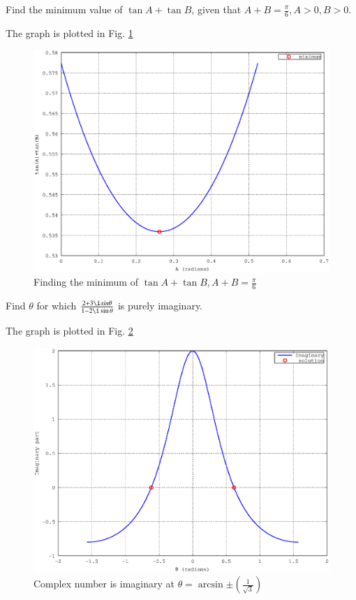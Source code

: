 \documentclass[journal,12pt,twocolumn]{IEEEtran}
\begin{document}
\begin{problem}
Find the minimum value of $\tan A + \tan B$, given that $ A+B = \frac{\pi}{6}, A>0,B>0$.
\end{problem}
%
\solution

The graph is plotted in Fig. \ref{fig_25}

%
\begin{figure}[h]
\centering
\includegraphics[width=\columnwidth]{./version_2/ee16b1025/ee16b1025}
\caption{ Finding the minimum of $\tan A + \tan B, A + B = \frac{\pi}{6}$}
\label{fig_25}	
\end{figure}
%
\begin{problem}
Find $\theta$ for which $\frac{2+3\i sin \theta}{1 - 2\i \sin \theta}$ is purely imaginary.
\end{problem}
%
\solution

The graph is plotted in Fig. \ref{fig_26}

%
\begin{figure}[h]
\centering
\includegraphics[width=\columnwidth]{./version_2/ee16b1026/ee16b1026}
\caption{ Complex number is imaginary at $\theta=\arcsin{\pm\left(\frac{1}{\sqrt{3}}\right)}$   }
\label{fig_26}	
\end{figure}
\end{document}

